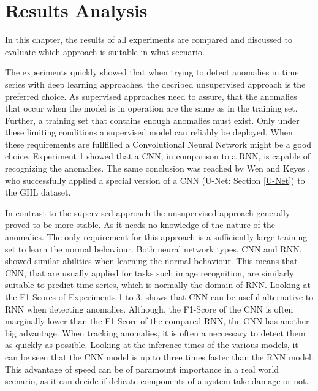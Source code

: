 \chapter{Results Analysis}

In this chapter, the results of all experiments are compared and discussed to evaluate which approach is suitable in what scenario. 

The experiments quickly showed that when trying to detect anomalies in time series with deep learning approaches, the decribed unsupervised approach is the preferred choice. As supervised approaches need to assure, that the anomalies that occur when the model is in operation are the same as in the training set. Further, a training set that contains enough anomalies must exist. Only under these limiting conditions a supervised model can reliably be deployed. When these requirements are fullfilled a Convolutional Neural Network might be a good choice. 
Experiment 1 showed that a CNN, in comparison to a RNN, is capable of recognizing the anomalies. The same conclusion was reached by Wen and Keyes \parencite*{Wen2019}, who successfully applied a special version of a CNN (U-Net: Section \ref{U-Net}) to the GHL dataset.  

In contrast to the supervised approach the unsupervised approach generally proved to be more stable. As it needs no knowledge of the nature of the anomalies. The only requirement for this approach is a sufficiently large training set to learn the normal behaviour. Both neural network types, CNN and RNN, showed similar abilities when learning the normal behaviour. This means that CNN, that are usually applied for tasks such image recognition, are similarly suitable to predict time series, which is normally the domain of RNN. Looking at the F1-Scores of Experiments 1 to 3, shows that CNN can be useful alternative to RNN when detecting anomalies. Although, the F1-Score of the CNN is often marginally lower than the F1-Score of the compared RNN, the CNN has another big advantage. When tracking anomalies, it is often a neccessary to detect them as quickly as possible. Looking at the inference times of the various models, it can be seen that the CNN model is up to three times faster than the RNN model. This advantage of speed can be of paramount importance in a real world scenario, as it can decide if delicate components of a system take damage or not.

